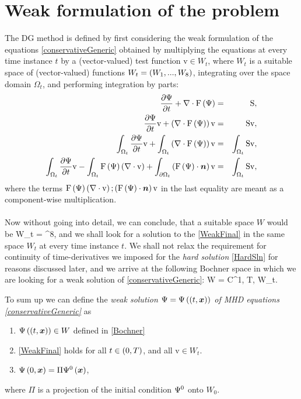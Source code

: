 \section{Weak formulation of the problem}
The DG method is defined by first considering the weak formulation of the equations \ref{conservativeGeneric} obtained by multiplying the equations at every time instance $t$ by a (vector-valued) test function $\mathrm{v}\in W_t$, where $W_t$ is a suitable space of (vector-valued) functions $W_t = \left( W_1, ..., W_8\right)$, integrating over the space domain $\Omega_{t}$, and performing integration by parts:
\begin{eqnarray}
\frac{\partial{\mathrm{\Psi}}}{\partial{t}} + \nabla \cdot \mathrm{F}\left(\mathrm{\Psi}\right) & = &\mathrm{S},\\
\frac{\partial{\mathrm{\Psi}}}{\partial{t}} \mathrm{v} + \left(\nabla \cdot \mathrm{F}\left(\mathrm{\Psi}\right)\right) \mathrm{v} & = &\mathrm{S} \mathrm{v},\\
\int_{\Omega_{t}} \frac{\partial{\mathrm{\Psi}}}{\partial{t}} \mathrm{v} + \int_{\Omega_{t}} \left(\nabla \cdot \mathrm{F}\left(\mathrm{\Psi}\right)\right) \mathrm{v} & = & \int_{\Omega_{t}} \mathrm{S} \mathrm{v},\\
\label{WeakFinal} \int_{\Omega_{t}} \frac{\partial{\mathrm{\Psi}}}{\partial{t}} \mathrm{v} - \int_{\Omega_{t}}\mathrm{F}\left(\mathrm{\Psi}\right) \left(\nabla \cdot \mathrm{v}\right) + \int_{\partial\Omega_{t}} \left(\mathrm{F}\left(\mathrm{\Psi}\right) \cdot \mbox{\boldmath $n$} \right)\mathrm{v} & = & \int_{\Omega_{t}} \mathrm{S} \mathrm{v},
\end{eqnarray}
where the terms $\mathrm{F}\left(\mathrm{\Psi}\right) \left(\nabla \cdot \mathrm{v}\right); \left(\mathrm{F}\left(\mathrm{\Psi}\right) \cdot \mbox{\boldmath $n$} \right)\mathrm{v}$ in the last equality are meant as a component-wise multiplication.
\paragraph{}
Now without going into detail, we can conclude, that a suitable space $W$ would be
\be
\label{Sobolev} W_t = ^8,
\ee
and we shall look for a solution to the \ref{WeakFinal} in the same space $W_t$ at every time instance $t$. We shall not relax the requirement for continuity of time-derivatives we imposed for the \textit{hard solution} \ref{HardSln} for reasons discussed later, and we arrive at the following Bochner space in which we are looking for a weak solution of \ref{conservativeGeneric}:
\be
\label{Bochner} W = C^{1}\lo{}, T\ro, W_t\ro.
\ee

To sum up we can define the \textit{weak solution $\mathrm{\Psi} = \mathrm{\Psi}\left((t, \mbox{\boldmath $x$}\right))$ of MHD equations \ref{conservativeGeneric}} as
\begin{enumerate}
    \label{weakSlnDef}
    \item $\mathrm{\Psi}\left((t, \mbox{\boldmath $x$}\right)) \in W$ defined in \ref{Bochner}
    \item \ref{WeakFinal} holds for all $t\in\left(0, T\right)$, and all $\mathrm{v}\in W_t$.
    \item $\mathrm{\Psi}\left(0, \mbox{\boldmath $x$}\right) = \Pi \mathrm{\Psi}^0\left(\mbox{\boldmath $x$}\right)$,
\end{enumerate}
where $\Pi$ is a projection of the initial condition $\mathrm{\Psi}^0$ onto $W_0$.